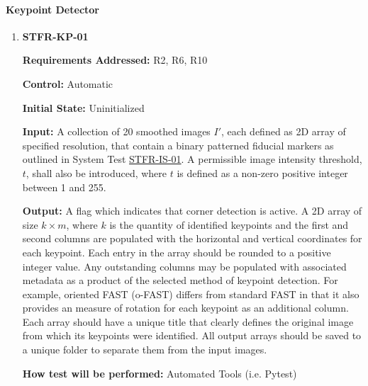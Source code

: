 \documentclass[12pt, titlepage]{article}
\begin{document}
\paragraph{Keypoint Detector}
\begin{enumerate}
\item \hypertarget{STFR-KP-01}{\textbf{STFR-KP-01}\\}
\textbf{Requirements Addressed:} R2, R6, R10

\textbf{Control:} Automatic	

\textbf{Initial State:} Uninitialized			

\textbf{Input:} A collection of 20 smoothed images $I'$, each defined as 2D array of specified resolution, that 
contain a binary patterned fiducial markers as outlined in System Test \hyperlink{STFR-IS-01}{STFR-IS-01}. 
A permissible image intensity threshold, $t$, shall also be introduced, where $t$ is defined as a non-zero 
positive integer between 1 and 255.

\textbf{Output:} A flag which indicates that corner detection is active. 
A 2D array of size ${k \times m}$, where $k$ is the quantity of identified keypoints and the first and second columns are populated with the horizontal and vertical coordinates for each keypoint. Each entry in the array should be rounded to a positive integer value. Any outstanding columns may be populated with associated metadata as a product of the selected method of keypoint detection. For example, oriented FAST (o-FAST) differs from standard FAST in that it also provides an measure of rotation for each keypoint as an additional column. Each array should have a unique title that clearly defines the original image from which its keypoints were identified. All output arrays should be saved to a unique folder to separate them from the input images.

\textbf{How test will be performed:} Automated Tools (i.e. Pytest)
\end{enumerate}
\end{document}
